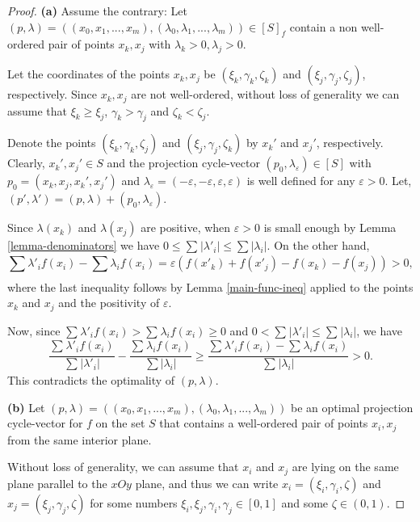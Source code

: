 \documentclass[12p]{article}
\numberwithin{equation}{section}
\begin{document}
\begin{proof}

\textbf{(a) }Assume the contrary: Let \((p,\lambda)=((x_0,x_1,...,x_m),(\lambda_0,\lambda_1,...,\lambda_m)) \in [S]_f\) contain a non well-ordered pair of points \(x_k,x_j\) with \(\lambda_k>0,\lambda_j>0\).
    
    Let the coordinates of the points \(x_k,x_j\) be \((\xi_k,\gamma_k,\zeta_k)\) and \((\xi_j,\gamma_j,\zeta_j)\), respectively. Since \(x_k,x_j\) are not well-ordered, without loss of generality we can assume that \(\xi_k \ge \xi_j\), \(\gamma_k > \gamma_j\) and \(\zeta_k < \zeta_j\).
    
    Denote the points \((\xi_k,\gamma_k,\zeta_j)\) and \((\xi_j,\gamma_j,\zeta_k)\) by \(x_k'\) and \(x_j'\), respectively.
    Clearly, \(x_k', x_j' \in S\) and the projection cycle-vector \((p_0,\lambda_\varepsilon) \in [S]\) with \(p_0=(x_k,x_j,x_k',x_j')\) and \(\lambda_\varepsilon=(-\varepsilon,-\varepsilon,\varepsilon,\varepsilon)\) is well defined for any \(\varepsilon>0\). Let, \((p',\lambda')=(p,\lambda)+(p_0,\lambda_\varepsilon)\).
    
   Since \(\lambda(x_k)\) and \(\lambda(x_j)\) are positive, when \(\varepsilon>0\) is small enough by Lemma \ref{lemma-denominators} we have \( 0 \le \sum_{}|\lambda'_i| \le  \sum|\lambda_i|\). On the other hand, 
     \[
     \sum_{}\lambda'_if(x_i)-\sum_{}\lambda_if(x_i)=\varepsilon(f(x'_k)+f(x'_j)-f(x_k)-f(x_j))>0,
     \]
where the last inequality follows by Lemma \ref{main-func-ineq} applied to the points \(x_k\) and \(x_j\) and the positivity of \(\varepsilon\).

Now, since \(\sum_{}\lambda'_if(x_i) > \sum_{}\lambda_if(x_i) \ge 0 \) and \( 0<\sum_{}|\lambda'_i| \le \sum_{}|\lambda_i|\), we have
     \[
    \frac{\sum_{}\lambda'_if(x_i)}{\sum_{}|\lambda'_i|}-\frac{\sum_{}\lambda_if(x_i)}{\sum|\lambda_i|} \ge \frac{\sum_{}\lambda'_if(x_i)-\sum_{}\lambda_if(x_i)}{\sum_{}|\lambda_i|}>0.
     \]
This contradicts the optimality of $(p,\lambda)$.

\textbf{(b)} 
    Let \((p,\lambda)=((x_0,x_1,...,x_m),(\lambda_0,\lambda_1,...,\lambda_m))\) be an optimal projection cycle-vector for \(f\) on the set \(S\) that contains a well-ordered pair of points \(x_i,x_j\) from the same interior plane.
    
    Without loss of generality, we can assume that \(x_i\) and \(x_j\) are lying on the same plane parallel to the \(xOy\) plane, and thus we can write \(x_i=(\xi_i,\gamma_i,\zeta)\) and \(x_j=(\xi_j,\gamma_j,\zeta)\) for some numbers \(\xi_i,\xi_j,\gamma_i,\gamma_j \in[0,1]\) and some \(\zeta \in (0,1)\). 
    

\end{proof}
\end{document}
